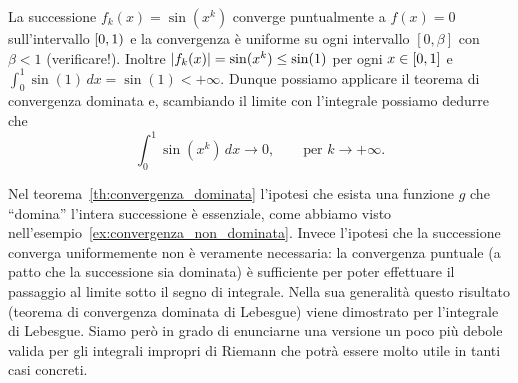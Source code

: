 \begin{example}
La successione $f_k(x) = \sin(x^k)$ converge puntualmente a $f(x)=0$ sull'intervallo
$\left[0,1\right)$ e la convergenza è uniforme su ogni intervallo $[0,\beta]$
con $\beta < 1$ (verificare!).
Inoltre ${\left|f_k(x)\right|} = \sin(x^k) \le \sin(1)$ per ogni $x\in {\left[ 0,1 \right]}$
e $\int_0^1 \sin(1)\, dx = \sin(1)< +\infty$.
Dunque possiamo applicare il teorema di convergenza dominata e,
scambiando il limite con l'integrale possiamo dedurre che
\[
  \int_0^1 \sin (x^k)\, dx \to 0, \qquad \text{per $k\to +\infty$.}
\]
\end{example}

Nel teorema~\ref{th:convergenza_dominata}
l'ipotesi che esista una funzione $g$ che ``domina'' l'intera successione 
è essenziale, come abbiamo visto nell'esempio~\ref{ex:convergenza_non_dominata}.
Invece l'ipotesi che la successione converga uniformemente non è veramente necessaria:
la convergenza puntuale (a patto che la successione sia dominata) è sufficiente 
per poter effettuare il passaggio al limite sotto il segno di integrale.
Nella sua generalità questo risultato (teorema di convergenza dominata di Lebesgue) 
viene dimostrato per l'integrale di Lebesgue.
%
%
%
%
%
Siamo però in grado di enunciarne una versione un poco più debole valida per gli 
integrali impropri di Riemann che potrà essere molto utile in tanti casi concreti.

